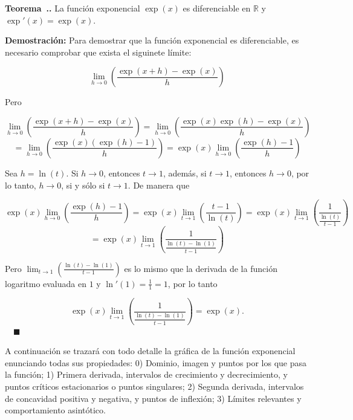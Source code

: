 \documentclass{article}
\numberwithin{equation}{section}
\newcommand{\Col}{\color{ProcessBlue}}
\newcounter{theorem}[section]
\newenvironment
{theorem}[1][]
{\vspace{0.5cm}\refstepcounter{theorem}\par\medskip\noindent\textbf{\Col Teorema~\thesection.\thetheorem. #1}\rmfamily}
{}
\newenvironment
{proof}
{\par\medskip\noindent\textbf{Demostración:}\rmfamily}
{\Col\hfill$\quad \blacksquare$\vspace{0.5cm}}
\begin{document}
\begin{theorem}
    La función exponencial $\exp(x)$ es diferenciable en $\mathbb{R}$ y $\exp'(x)=\exp(x)$.
\end{theorem}

\begin{proof}
    Para demostrar que la función exponencial es diferenciable, es necesario comprobar que exista el siguinete límite:

    $$ \lim_{h\to 0}\left(\frac{\exp(x+h)-\exp(x)}{h}\right) $$

    Pero 

    $$ \lim_{h\to 0}\left(\frac{\exp(x+h)-\exp(x)}{h}\right)=\lim_{h\to 0}\left(\frac{\exp(x)\exp(h)-\exp(x)}{h}\right) $$
    $$ =\lim_{h\to 0}\left(\frac{\exp(x)(\exp(h)-1)}{h}\right)=\exp(x)\lim_{h\to 0}\left(\frac{\exp(h)-1}{h}\right) $$

    Sea $h=\ln(t)$. Si $h\to 0$, entonces $t\to 1$, además, si $t\to 1$, entonces $h\to 0$, por lo tanto, $h\to 0$, si y sólo si $t\to 1$. De manera que

    $$ \exp(x)\lim_{h\to 0}\left(\frac{\exp(h)-1}{h}\right)=\exp(x)\lim_{t\to 1}\left(\frac{t-1}{\ln(t)}\right)=\exp(x)\lim_{t\to 1}\left(\frac{1}{\frac{\ln(t)}{t-1}}\right) $$
    $$ =\exp(x)\lim_{t\to 1}\left(\frac{1}{\frac{\ln(t)-\ln(1)}{t-1}}\right) $$

    Pero $ \lim_{t\to 1}\left(\frac{\ln(t)-\ln(1)}{t-1}\right) $ es lo mismo que la derivada de la función logaritmo evaluada en $1$ y $\ln'(1)=\frac{1}{1}=1$, por lo tanto

    $$ \exp(x)\lim_{t\to 1}\left(\frac{1}{\frac{\ln(t)-\ln(1)}{t-1}}\right)=\exp(x).$$
\end{proof}

A continuación se trazará con todo detalle la gráfica de la función exponencial enunciando todas sus propiedades: 0) Dominio, imagen y puntos por los que pasa la función; 1) Primera derivada, intervalos de crecimiento y decrecimiento, y puntos críticos estacionarios o puntos singulares; 2) Segunda derivada, intervalos de concavidad positiva y negativa, y puntos de inflexión; 3) Límites relevantes y comportamiento asintótico. 
\end{document}
